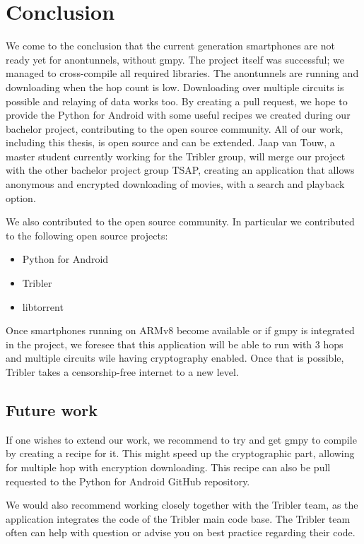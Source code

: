\chapter{Conclusion}
\label{cpt:conclusion}
	We come to the conclusion that the current generation smartphones are not ready yet for anontunnels, without gmpy. The project itself was successful; we managed to cross-compile all required libraries. The anontunnels are running and downloading when the hop count is low. Downloading over multiple circuits is possible and relaying of data works too. By creating a pull request, we hope to provide the Python for Android with some useful recipes we created during our bachelor project, contributing to the open source community. 
	All of our work, including this thesis, is open source and can be extended. Jaap van Touw, a master student currently working for the Tribler group, will merge our project with the other bachelor project group TSAP, creating an application that allows anonymous and encrypted downloading of movies, with a search and playback option.
	
	We also contributed to the open source community. In particular we contributed to the following open source projects:
	\begin{itemize}
		\item Python for Android
		\item Tribler
		\item libtorrent
	\end{itemize}
	
	
	Once smartphones running on ARMv8 become available or if gmpy is integrated in the project, we foresee that this application will be able to run with 3 hops and multiple circuits wile having cryptography enabled. Once that is possible, Tribler takes a censorship-free internet to a new level.
	
	\section{Future work}
		If one wishes to extend our work, we recommend to try and get gmpy to compile by creating a recipe for it. This might speed up the cryptographic part, allowing for multiple hop with encryption downloading. This recipe can also be pull requested to the Python for Android GitHub repository.
		
		We would also recommend working closely together with the Tribler team, as the application integrates the code of the Tribler main code base. The Tribler team often can help with question or advise you on best practice regarding their code.
		
